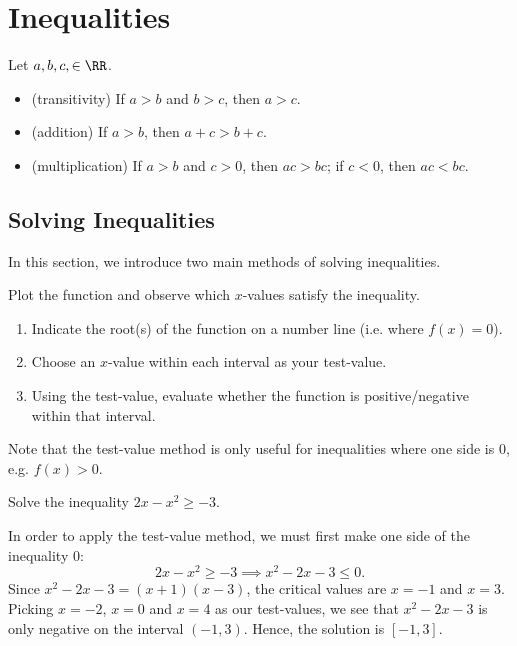 \section{Inequalities}

\begin{fact}
    Let $a, b, c, \in \RR$.
    \begin{itemize}
        \item (transitivity) If $a > b$ and $b > c$, then $a > c$.
        \item (addition) If $a > b$, then $a + c > b + c$.
        \item (multiplication) If $a > b$ and $c > 0$, then $ac > bc$; if $c < 0$, then $ac < bc$.
    \end{itemize}
\end{fact}

\subsection{Solving Inequalities}

In this section, we introduce two main methods of solving inequalities.

\begin{recipe}
    Plot the function and observe which $x$-values satisfy the inequality.
\end{recipe}
\begin{recipe}
    \phantom{.}
    \renewcommand{\theenumi}{\arabic{enumi}.}%
    \begin{enumerate}
        \item Indicate the root(s) of the function on a number line (i.e. where $f(x) = 0$).
        \item Choose an $x$-value within each interval as your test-value.
        \item Using the test-value, evaluate whether the function is positive/negative within that interval.
    \end{enumerate}
    \renewcommand{\theenumi}{(\alph{enumi})}
\end{recipe}
Note that the test-value method is only useful for inequalities where one side is 0, e.g. $f(x) > 0$.

\begin{sample}
    Solve the inequality $2x - x^2 \geq -3$.
\end{sample}
\begin{sampans}
    In order to apply the test-value method, we must first make one side of the inequality 0: \[2x - x^2 \geq -3 \implies x^2 - 2x - 3 \leq 0.\] Since $x^2 - 2x - 3 = (x+1)(x-3)$, the critical values are $x = -1$ and $x = 3$. Picking $x = -2$, $x = 0$ and $x = 4$ as our test-values, we see that $x^2 - 2x - 3$ is only negative on the interval $(-1, 3)$. Hence, the solution is $[-1, 3]$.
\end{sampans}

